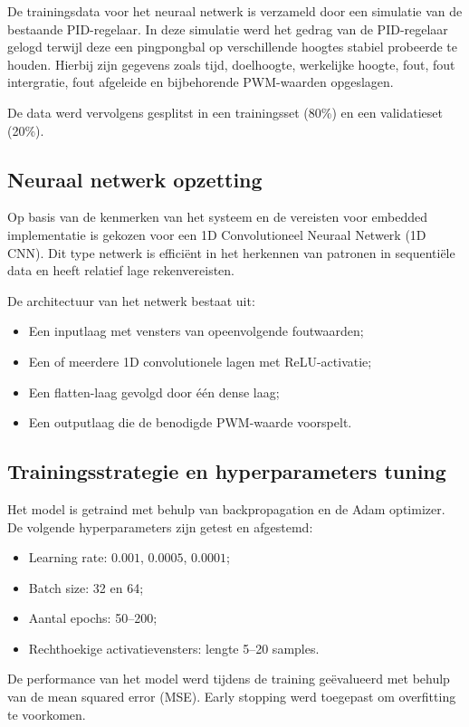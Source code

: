 De trainingsdata voor het neuraal netwerk is verzameld door een simulatie van de bestaande PID-regelaar. In deze simulatie werd het gedrag van de PID-regelaar gelogd terwijl deze een pingpongbal op verschillende hoogtes stabiel probeerde te houden. Hierbij zijn gegevens zoals tijd, doelhoogte, werkelijke hoogte, fout, fout intergratie, fout afgeleide en bijbehorende PWM-waarden opgeslagen.

De data werd vervolgens gesplitst in een trainingsset (80\%) en een validatieset (20\%).

\subsection{Neuraal netwerk opzetting}

Op basis van de kenmerken van het systeem en de vereisten voor embedded implementatie is gekozen voor een 1D Convolutioneel Neuraal Netwerk (1D CNN). Dit type netwerk is efficiënt in het herkennen van patronen in sequentiële data en heeft relatief lage rekenvereisten.

De architectuur van het netwerk bestaat uit:
\begin{itemize}
    \item Een inputlaag met vensters van opeenvolgende foutwaarden;
    \item Een of meerdere 1D convolutionele lagen met ReLU-activatie;
    \item Een flatten-laag gevolgd door één dense laag;
    \item Een outputlaag die de benodigde PWM-waarde voorspelt.
\end{itemize}

\subsection{Trainingsstrategie en hyperparameters tuning}
Het model is getraind met behulp van backpropagation en de Adam optimizer. De volgende hyperparameters zijn getest en afgestemd:
\begin{itemize}
    \item Learning rate: $0.001$, $0.0005$, $0.0001$;
    \item Batch size: 32 en 64;
    \item Aantal epochs: 50–200;
    \item Rechthoekige activatievensters: lengte 5–20 samples.
\end{itemize}

De performance van het model werd tijdens de training geëvalueerd met behulp van de mean squared error (MSE). Early stopping werd toegepast om overfitting te voorkomen.

